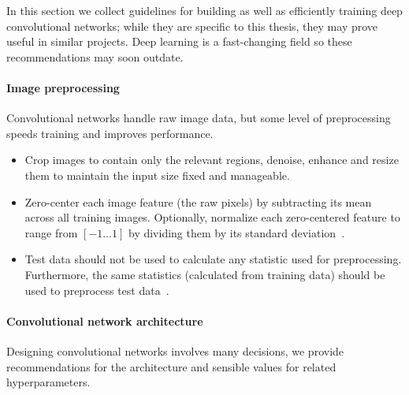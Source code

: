 In this section we collect guidelines for building as well as efficiently training deep convolutional networks; while they are specific to this thesis, they may prove useful in similar projects. Deep learning is a fast-changing field so these recommendations may soon outdate.

\paragraph{Image preprocessing} Convolutional networks handle raw image data, but some level of preprocessing speeds training and improves performance.
\begin{itemize}
	\item Crop images to contain only the relevant regions, denoise, enhance and resize them to maintain the input size fixed and manageable.

	\item Zero-center each image feature (the raw pixels) by subtracting its mean across all training images. Optionally, normalize each zero-centered feature to range from $[-1 \dots 1]$ by dividing them by its standard deviation~\cite{Karpathy2016}.

	\item Test data should not be used to calculate any statistic used for preprocessing. Furthermore, the same statistics (calculated from training data) should be used to preprocess test data~\cite{Karpathy2016}.
\end{itemize}



\paragraph{Convolutional network architecture} Designing convolutional networks involves many decisions, we provide recommendations for the architecture and sensible values for related hyperparameters.


